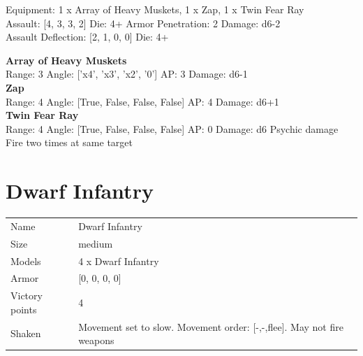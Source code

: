 Equipment: 1 x Array of Heavy Muskets, 1 x Zap, 1 x Twin Fear Ray \\

Assault: [4, 3, 3, 2] Die: 4+ Armor Penetration: 2 Damage: d6-2 \\
Assault Deflection: [2, 1, 0, 0] Die: 4+\\
\indent  



{\bf Array of Heavy Muskets } \\



Range: 3  Angle: ['x4', 'x3', 'x2', '0'] AP: 3 Damage: d6-1 \\




{\bf Zap } \\



Range: 4  Angle: [True, False, False, False] AP: 4 Damage: d6+1 \\




{\bf Twin Fear Ray } \\



Range: 4  Angle: [True, False, False, False] AP: 0 Damage: d6 Psychic damage \\
Fire two times at same target\\ 




 















\clearpage

\section{ Dwarf Infantry }

\begin{tabular}{ll}
  Name & Dwarf Infantry \\
  Size & medium\\
  Models & 4 x Dwarf Infantry\\
  Armor & [0, 0, 0, 0]\\
  Victory points & 4\\
  Shaken & Movement set to slow. Movement order: [-,-,flee]. May not fire weapons\\
\end{tabular}

